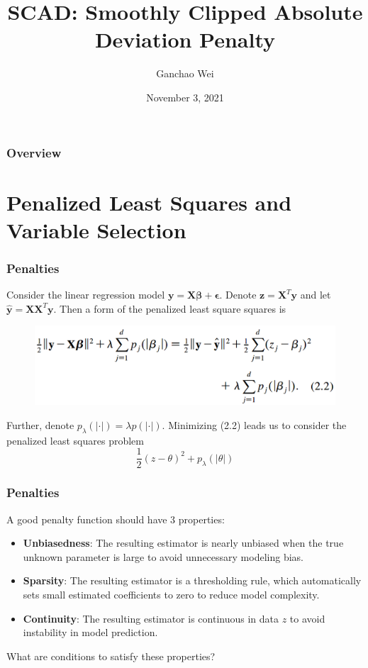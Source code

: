 \documentclass{beamer}
\title[SCAD]{SCAD: Smoothly Clipped Absolute Deviation Penalty}
\author{Ganchao Wei}
\date{November 3, 2021}
\begin{document}
	
	\begin{frame}
		\titlepage %
	\end{frame}
	
	\begin{frame}
		\frametitle{Overview} %
		\tableofcontents
	\end{frame}
	
	
	\section{Penalized Least Squares and Variable Selection}
	
	\begin{frame}
		\frametitle{Penalties}
		Consider the linear regression model $\bm{y}=\bm{X\beta} + \bm{\epsilon}$. Denote $\bm{z}=\bm{X}^{T}\bm{y}$ and let $\hat{\bm{y}} = \bm{XX}^T\bm{y}$. Then a form of the penalized least square squares is
		\begin{figure}
			\includegraphics[width=0.8\linewidth]{image001.png}
		\end{figure} 
		Further, denote $p_{\lambda}(|\cdot|) = \lambda p(|\cdot|)$. Minimizing (2.2) leads us to consider the penalized least squares problem
		$$\frac{1}{2}(z-\theta)^2 + p_{\lambda}(|\theta|)$$
	\end{frame}
	
	
	\begin{frame}
		\frametitle{Penalties}
		A good penalty function should have 3 properties:
		\begin{itemize}
			\item
			\textbf{Unbiasedness}: The resulting estimator is nearly unbiased when the true unknown parameter is large to avoid unnecessary modeling bias.
			\item
			\textbf{Sparsity}: The resulting estimator is a thresholding rule, which automatically sets small estimated coefficients to zero to reduce model complexity.
			\item
			\textbf{Continuity}: The resulting estimator is continuous in data $z$ to avoid instability in model prediction.
		\end{itemize}
		What are conditions to satisfy these properties?
	\end{frame} 
	
\end{document}
